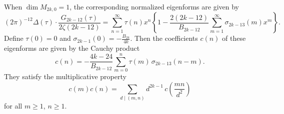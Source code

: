 When $\dim M_{2k,0} = 1$, the corresponding normalized eigenforms are given by
$$
(2\pi)^{-12} \Delta(\tau) \cdot \frac{G_{2k-12}(\tau)}{2\zeta(2k-12)} = \sum_{n=1}^{\infty} \tau(n)x^n \left\{ 1 - \frac{2(2k-12)}{B_{2k-12}} \sum_{m=1}^{\infty} \sigma_{2k-13}(m)x^m \right\}.
$$
Define $\tau(0) = 0$ and $\sigma_{2k-1}(0) = -\frac{B_{2k}}{4k}$. Then the coefficients $c(n)$ of these eigenforms are given by the Cauchy product
$$
c(n) = -\frac{4k-24}{B_{2k-12}} \sum_{m=0}^{n} \tau(m) \, \sigma_{2k-13}(n-m).
$$
They satisfy the multiplicative property
$$
c(m) c(n) = \sum_{d \mid (m,n)} d^{2k-1} \, c\!\left( \frac{mn}{d^2} \right)
$$
for all $m \geq 1$, $n \geq 1$.
